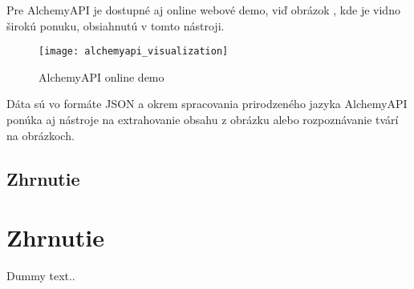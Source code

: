 Pre AlchemyAPI je dostupné aj online webové demo, viď obrázok , kde je vidno širokú ponuku, obsiahnutú v tomto nástroji.

\begin{figure}[H]
\begin{center}\texttt{[image: alchemyapi\_visualization]}\end{center}
\caption[AlchemyAPI online demo]{AlchemyAPI online demo}\label{fig:alchemyapi_visualization}
\end{figure}

Dáta sú vo formáte JSON a okrem spracovania prirodzeného jazyka AlchemyAPI ponúka aj nástroje na extrahovanie obsahu z obrázku alebo rozpoznávanie tvárí na obrázkoch.

%
%
{
	\subsection{Zhrnutie}
}
{
	\section{Zhrnutie}
}
\label{subsec:analysis:zhrnutie}

Dummy text..